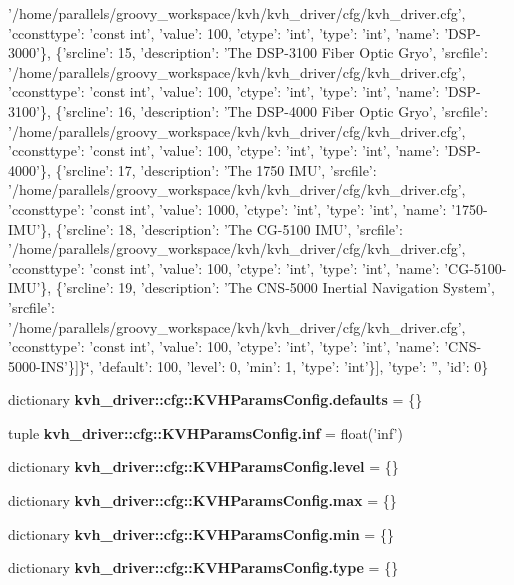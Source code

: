 \begin{DoxyCompactItemize}
'/home/parallels/groovy\-\_\-workspace/kvh/kvh\-\_\-driver/cfg/kvh\-\_\-driver.\-cfg', 'cconsttype'\-: 'const int', 'value'\-: 100, 'ctype'\-: 'int', 'type'\-: 'int', 'name'\-: '\-D\-S\-P-\/3000'\}, \{'srcline'\-: 15, 'description'\-: '\-The \-D\-S\-P-\/3100 \-Fiber \-Optic \-Gryo', 'srcfile'\-: '/home/parallels/groovy\-\_\-workspace/kvh/kvh\-\_\-driver/cfg/kvh\-\_\-driver.\-cfg', 'cconsttype'\-: 'const int', 'value'\-: 100, 'ctype'\-: 'int', 'type'\-: 'int', 'name'\-: '\-D\-S\-P-\/3100'\}, \{'srcline'\-: 16, 'description'\-: '\-The \-D\-S\-P-\/4000 \-Fiber \-Optic \-Gryo', 'srcfile'\-: '/home/parallels/groovy\-\_\-workspace/kvh/kvh\-\_\-driver/cfg/kvh\-\_\-driver.\-cfg', 'cconsttype'\-: 'const int', 'value'\-: 100, 'ctype'\-: 'int', 'type'\-: 'int', 'name'\-: '\-D\-S\-P-\/4000'\}, \{'srcline'\-: 17, 'description'\-: '\-The 1750 \-I\-M\-U', 'srcfile'\-: '/home/parallels/groovy\-\_\-workspace/kvh/kvh\-\_\-driver/cfg/kvh\-\_\-driver.\-cfg', 'cconsttype'\-: 'const int', 'value'\-: 1000, 'ctype'\-: 'int', 'type'\-: 'int', 'name'\-: '1750-\/\-I\-M\-U'\}, \{'srcline'\-: 18, 'description'\-: '\-The \-C\-G-\/5100 \-I\-M\-U', 'srcfile'\-: '/home/parallels/groovy\-\_\-workspace/kvh/kvh\-\_\-driver/cfg/kvh\-\_\-driver.\-cfg', 'cconsttype'\-: 'const int', 'value'\-: 100, 'ctype'\-: 'int', 'type'\-: 'int', 'name'\-: '\-C\-G-\/5100-\/\-I\-M\-U'\}, \{'srcline'\-: 19, 'description'\-: '\-The \-C\-N\-S-\/5000 \-Inertial \-Navigation \-System', 'srcfile'\-: '/home/parallels/groovy\-\_\-workspace/kvh/kvh\-\_\-driver/cfg/kvh\-\_\-driver.\-cfg', 'cconsttype'\-: 'const int', 'value'\-: 100, 'ctype'\-: 'int', 'type'\-: 'int', 'name'\-: '\-C\-N\-S-\/5000-\/\-I\-N\-S'\}]\}\char`\"{}, 'default'\-: 100, 'level'\-: 0, 'min'\-: 1, 'type'\-: 'int'\}], 'type'\-: '', 'id'\-: 0\}
\item 
dictionary {\bf kvh\-\_\-driver\-::cfg\-::\-K\-V\-H\-Params\-Config.\-defaults} = \{\}
\item 
tuple {\bf kvh\-\_\-driver\-::cfg\-::\-K\-V\-H\-Params\-Config.\-inf} = float('inf')
\item 
dictionary {\bf kvh\-\_\-driver\-::cfg\-::\-K\-V\-H\-Params\-Config.\-level} = \{\}
\item 
dictionary {\bf kvh\-\_\-driver\-::cfg\-::\-K\-V\-H\-Params\-Config.\-max} = \{\}
\item 
dictionary {\bf kvh\-\_\-driver\-::cfg\-::\-K\-V\-H\-Params\-Config.\-min} = \{\}
\item 
dictionary {\bf kvh\-\_\-driver\-::cfg\-::\-K\-V\-H\-Params\-Config.\-type} = \{\}
\end{DoxyCompactItemize}
